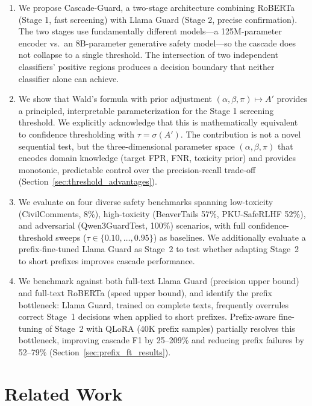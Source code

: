 \documentclass[acmtjournal, acmnowidth]{acmart}
\theoremstyle{definition}
\begin{document}
\begin{enumerate}
    \item We propose Cascade-Guard, a two-stage architecture combining RoBERTa (Stage 1, fast screening) with Llama Guard (Stage 2, precise confirmation). The two stages use fundamentally different models---a 125M-parameter encoder vs.\ an 8B-parameter generative safety model---so the cascade does not collapse to a single threshold. The intersection of two independent classifiers' positive regions produces a decision boundary that neither classifier alone can achieve.

    \item We show that Wald's formula with prior adjustment $(\alpha, \beta, \pi) \mapsto A'$ provides a principled, interpretable parameterization for the Stage 1 screening threshold. We explicitly acknowledge that this is mathematically equivalent to confidence thresholding with $\tau = \sigma(A')$. The contribution is not a novel sequential test, but the three-dimensional parameter space $(\alpha, \beta, \pi)$ that encodes domain knowledge (target FPR, FNR, toxicity prior) and provides monotonic, predictable control over the precision-recall trade-off (Section~\ref{sec:threshold_advantages}).

    \item We evaluate on four diverse safety benchmarks spanning low-toxicity (CivilComments, 8\%), high-toxicity (BeaverTails 57\%, PKU-SafeRLHF 52\%), and adversarial (Qwen3GuardTest, 100\%) scenarios, with full confidence-threshold sweeps ($\tau \in \{0.10, \ldots, 0.95\}$) as baselines. We additionally evaluate a prefix-fine-tuned Llama Guard as Stage~2 to test whether adapting Stage~2 to short prefixes improves cascade performance.

    \item We benchmark against both full-text Llama Guard (precision upper bound) and full-text RoBERTa (speed upper bound), and identify the prefix bottleneck: Llama Guard, trained on complete texts, frequently overrules correct Stage~1 decisions when applied to short prefixes. Prefix-aware fine-tuning of Stage~2 with QLoRA (40K prefix samples) partially resolves this bottleneck, improving cascade F1 by 25--209\% and reducing prefix failures by 52--79\% (Section~\ref{sec:prefix_ft_results}).
\end{enumerate}

\section{Related Work}
\end{document}
